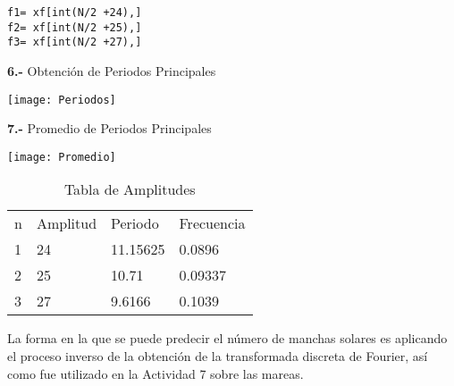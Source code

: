 \documentclass[12pt]{article}
\begin{document}
\begin{verbatim}
f1= xf[int(N/2 +24),]
f2= xf[int(N/2 +25),]
f3= xf[int(N/2 +27),]
\end{verbatim}


\newpage
\textbf{6.-} Obtención de Periodos Principales

\begin{center}
\texttt{[image: Periodos]}
\end{center}


\textbf{7.-} Promedio de Periodos Principales

\begin{center}
\texttt{[image: Promedio]}
\end{center}

\begin{table}[]
\centering
\caption{Tabla de Amplitudes}
\label{my-label}
\begin{tabular}{llll}
n & Amplitud & Periodo  & Frecuencia \\
1 & 24       & 11.15625 & 0.0896     \\
2 & 25       & 10.71    & 0.09337    \\
3 & 27       & 9.6166   & 0.1039    
\end{tabular}
\end{table}

La forma en la que se puede predecir el número de manchas solares es aplicando el proceso inverso de la obtención de la transformada discreta de Fourier, así como fue utilizado en la Actividad 7 sobre las mareas.







    
    
    
    
    
    
    
    
    
    
\end{document}
